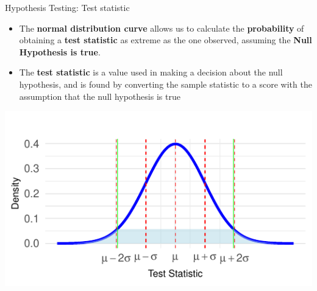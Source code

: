 \documentclass[
  ignorenonframetext,
]{beamer}
\providecommand{\tightlist}{%
  \setlength{\itemsep}{0pt}\setlength{\parskip}{0pt}}
\begin{document}
\begin{frame}{Hypothesis Testing: Test statistic}
\label{hypothesis-testing-test-statistic-1}
\begin{itemize}
\tightlist
\item
  The \textbf{normal distribution curve} allows us to calculate the
  \textbf{probability} of obtaining a \textbf{test statistic} as extreme
  as the one observed, assuming the \textbf{Null Hypothesis is true}.
\end{itemize}

\begin{itemize}
\tightlist
\item
  The \textbf{test statistic} is a value used in making a decision about
  the null hypothesis, and is found by converting the sample statistic
  to a score with the assumption that the null hypothesis is true
\end{itemize}

\includegraphics{M5-Hypothesis-Testing,-Probability-and-Distribution_files/figure-beamer/unnamed-chunk-8-1.pdf}
\end{frame}
\end{document}
